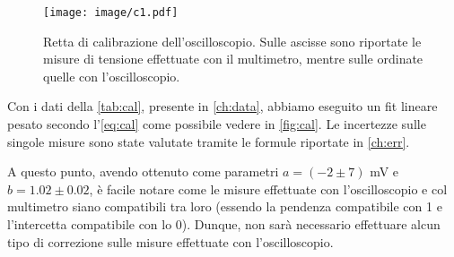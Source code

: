 \begin{figure}[h!]
    \centering
    \texttt{[image: image/c1.pdf]}
    \caption{Retta di calibrazione dell'oscilloscopio. Sulle ascisse sono riportate le misure di tensione effettuate con il multimetro, mentre sulle ordinate quelle con l'oscilloscopio.}
    \label{fig:cal}
\end{figure}
Con i dati della \autoref{tab:cal}, presente in \autoref{ch:data}, abbiamo eseguito un fit lineare pesato secondo l'\autoref{eq:cal} come possibile vedere in \autoref{fig:cal}. Le incertezze sulle singole misure sono state valutate tramite le formule riportate in \autoref{ch:err}.

A questo punto, avendo ottenuto come parametri $a = (-2 \pm 7)$ \si{\milli\volt} e $b = 1.02 \pm 0.02$, è facile notare come le misure effettuate con l'oscilloscopio e col multimetro siano compatibili tra loro (essendo la pendenza compatibile con 1 e l’intercetta compatibile con lo 0). Dunque, non sarà necessario effettuare alcun tipo di correzione sulle misure effettuate con l’oscilloscopio.